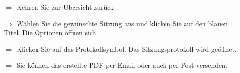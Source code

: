 \documentclass[twocolumn]{article}
\begin{document}
\begin{tcolorbox}[colback=blue!5,colframe=blue!40!black,title=Protokoll bearbeiten]
\begin{itemize}
  \item[$\Longrightarrow$] Kehren Sie zur Übersicht zurück
  \item[$\Longrightarrow$] Wählen Sie die gewünschte Sitzung aus und klicken Sie auf den blauen Titel. Die Optionen öffnen sich
  \item[$\Longrightarrow$] Klicken Sie auf das Protokollsymbol. Das Sitzungsprotokoll wird geöffnet.
  \item[$\Longrightarrow$] Sie können das erstellte PDF per Email oder auch per Post versenden.
\end{itemize}
\end{tcolorbox}
\end{document}
